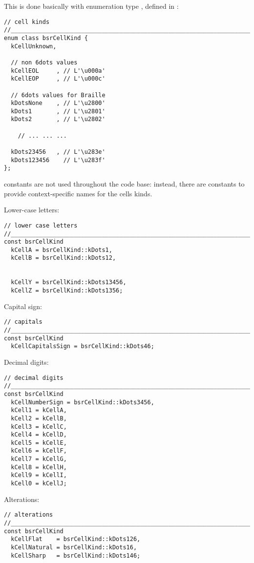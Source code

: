 This is done basically with enumeration type , defined in :
\begin{lstlisting}[language=CPlusPlus]
// cell kinds
//______________________________________________________________________________
enum class bsrCellKind {
  kCellUnknown,

  // non 6dots values
  kCellEOL     , // L'\u000a'
  kCellEOP     , // L'\u000c'

  // 6dots values for Braille
  kDotsNone    , // L'\u2800'
  kDots1       , // L'\u2801'
  kDots2       , // L'\u2802'

	// ... ... ...

  kDots23456   , // L'\u283e'
  kDots123456    // L'\u283f'
};

\end{lstlisting}

 constants are not used throughout the code base: instead, there are  constants to provide context-specific names for the cells kinds.

Lower-case letters:
\begin{lstlisting}[language=CPlusPlus]
// lower case letters
//______________________________________________________________________________
const bsrCellKind
  kCellA = bsrCellKind::kDots1,
  kCellB = bsrCellKind::kDots12,


  kCellY = bsrCellKind::kDots13456,
  kCellZ = bsrCellKind::kDots1356;
\end{lstlisting}

Capital sign:
\begin{lstlisting}[language=CPlusPlus]
// capitals
//______________________________________________________________________________
const bsrCellKind
  kCellCapitalsSign = bsrCellKind::kDots46;
\end{lstlisting}

Decimal digits:
\begin{lstlisting}[language=CPlusPlus]
// decimal digits
//______________________________________________________________________________
const bsrCellKind
  kCellNumberSign = bsrCellKind::kDots3456,
  kCell1 = kCellA,
  kCell2 = kCellB,
  kCell3 = kCellC,
  kCell4 = kCellD,
  kCell5 = kCellE,
  kCell6 = kCellF,
  kCell7 = kCellG,
  kCell8 = kCellH,
  kCell9 = kCellI,
  kCell0 = kCellJ;
\end{lstlisting}

Alterations:
\begin{lstlisting}[language=CPlusPlus]
// alterations
//______________________________________________________________________________
const bsrCellKind
  kCellFlat    = bsrCellKind::kDots126,
  kCellNatural = bsrCellKind::kDots16,
  kCellSharp   = bsrCellKind::kDots146;
\end{lstlisting}

